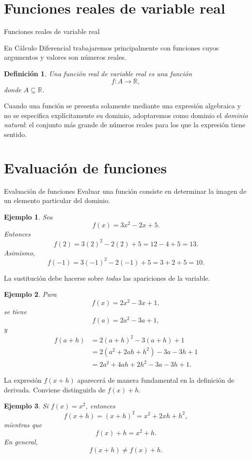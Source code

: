 \documentclass[aspectratio=169,10pt]{beamer}
\newtheorem{definicion}{Definición}
\newtheorem{ejemplo}{Ejemplo}
\newcommand{\R}{\mathbb{R}}
\begin{document}
\section{Funciones reales de variable real}
\begin{frame}{Funciones reales de variable real}

En Cálculo Diferencial trabajaremos principalmente con funciones cuyos
argumentos y valores son números reales.

\begin{definicion}
Una función real de variable real es una función
\[
f:A\to\R,
\]
donde $A\subseteq\R$.
\end{definicion}

Cuando una función se presenta solamente mediante una expresión algebraica y
no se especifica explícitamente su dominio, adoptaremos como dominio el
\emph{dominio natural}: el conjunto más grande de números reales para los que
la expresión tiene sentido.

\end{frame}
\section{Evaluación de funciones}
\begin{frame}{Evaluación de funciones}
Evaluar una función consiste en determinar la imagen de un elemento particular
del dominio.

\begin{ejemplo}
Sea
\[
f(x)=3x^2-2x+5.
\]
Entonces
\[
f(2)=3(2)^2-2(2)+5=12-4+5=13.
\]
Asimismo,
\[
f(-1)=3(-1)^2-2(-1)+5=3+2+5=10.
\]

\end{ejemplo}

La sustitución debe hacerse sobre \emph{todas} las apariciones de la variable.

\begin{ejemplo}
Para
\[
f(x)=2x^2-3x+1,
\]
se tiene
\[
f(a)=2a^2-3a+1,
\]
y
\begin{align*}
f(a+h)
 &=2(a+h)^2-3(a+h)+1\\
 &=2(a^2+2ah+h^2)-3a-3h+1\\
 &=2a^2+4ah+2h^2-3a-3h+1.
\end{align*}
\end{ejemplo}

La expresión $f(x+h)$ aparecerá de manera fundamental en la definición de
derivada. Conviene distinguirla de $f(x)+h$.

\begin{ejemplo}
Si $f(x)=x^2$, entonces
\[
f(x+h)=(x+h)^2=x^2+2xh+h^2,
\]
mientras que
\[
f(x)+h=x^2+h.
\]
En general,
\[
f(x+h)\neq f(x)+h.
\]
\end{ejemplo}
\end{frame}
\end{document}

